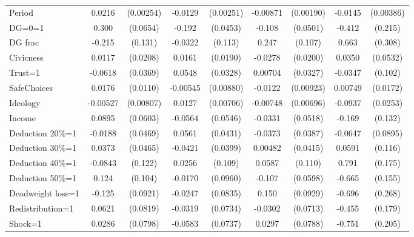 \begin{tabular}{l|cccccc|cc}
Period          &   0.0216\sym{***}&(0.00254)&  -0.0129\sym{***}&(0.00251)& -0.00871\sym{***}&(0.00190)&  -0.0145\sym{***}&(0.00386)\\
DG=0=1          &    0.300\sym{***}& (0.0654)&   -0.192\sym{***}& (0.0453)&   -0.108\sym{**} & (0.0501)&   -0.412\sym{*}  &  (0.215)\\
DG frac         &   -0.215         &  (0.131)&  -0.0322         &  (0.113)&    0.247\sym{**} &  (0.107)&    0.663\sym{**} &  (0.308)\\
Civicness       &   0.0117         & (0.0208)&   0.0161         & (0.0190)&  -0.0278         & (0.0200)&   0.0350         & (0.0532)\\
Trust=1         &  -0.0618\sym{*}  & (0.0369)&   0.0548\sym{*}  & (0.0328)&  0.00704         & (0.0327)&  -0.0347         &  (0.102)\\
SafeChoices     &   0.0176         & (0.0110)& -0.00545         &(0.00880)&  -0.0122         &(0.00923)&  0.00749         & (0.0172)\\
Ideology        & -0.00527         &(0.00807)&   0.0127\sym{*}  &(0.00706)& -0.00748         &(0.00696)&  -0.0937\sym{***}& (0.0253)\\
Income          &   0.0895         & (0.0603)&  -0.0564         & (0.0546)&  -0.0331         & (0.0518)&   -0.169         &  (0.132)\\
Deduction 20\%=1&  -0.0188         & (0.0469)&   0.0561         & (0.0431)&  -0.0373         & (0.0387)&  -0.0647         & (0.0895)\\
Deduction 30\%=1&   0.0373         & (0.0465)&  -0.0421         & (0.0399)&  0.00482         & (0.0415)&   0.0591         &  (0.116)\\
Deduction 40\%=1&  -0.0843         &  (0.122)&   0.0256         &  (0.109)&   0.0587         &  (0.110)&    0.791\sym{***}&  (0.175)\\
Deduction 50\%=1&    0.124         &  (0.104)&  -0.0170         & (0.0960)&   -0.107\sym{*}  & (0.0598)&   -0.665\sym{***}&  (0.155)\\
Deadweight loss=1&   -0.125         & (0.0921)&  -0.0247         & (0.0835)&    0.150         & (0.0929)&   -0.696\sym{**} &  (0.268)\\
Redistribution=1&   0.0621         & (0.0819)&  -0.0319         & (0.0734)&  -0.0302         & (0.0713)&   -0.455\sym{**} &  (0.179)\\
Shock=1         &   0.0286         & (0.0798)&  -0.0583         & (0.0737)&   0.0297         & (0.0788)&   -0.751\sym{***}&  (0.205)\\

\end{tabular}
